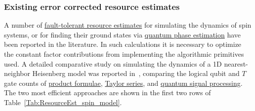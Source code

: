 \begin{refsection}
\subsubsection*{Existing error corrected resource estimates}
A number of \hyperref[prim:LatticeSurgery]{fault-tolerant resource estimates} for simulating the dynamics of spin systems, or for finding their ground states via \hyperref[prim:QPE]{quantum phase estimation} have been reported in the literature. In such calculations it is necessary to optimize the constant factor contributions from implementing the algorithmic primitives used. A detailed comparative study on simulating the dynamics of a 1D nearest-neighbor Heisenberg model was reported in~\cite{childs2018towardsFirstQSimSpeedup}, comparing the logical qubit and $T$ gate counts of \hyperref[prim:ProductFormulae]{product formulae}, \hyperref[prim:TaylorDyson]{Taylor series}, and \hyperref[prim:QSPqubitization]{quantum signal processing}. The two most efficient approaches are shown in the first two rows of Table~\ref{Tab:ResourceEst_spin_model}.





\end{refsection}
